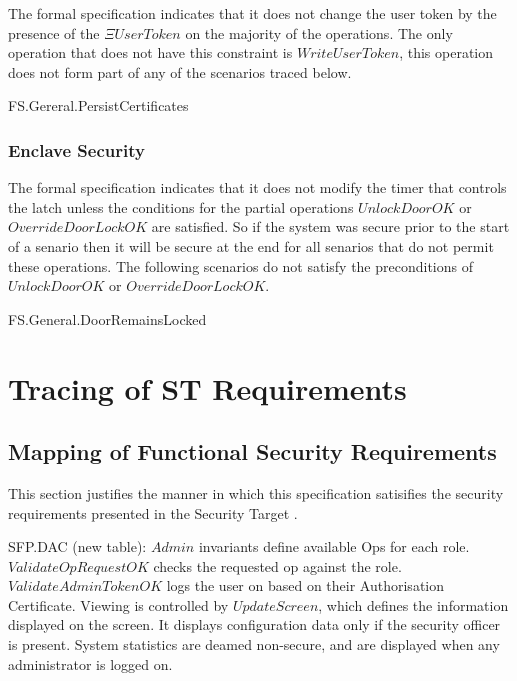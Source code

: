 The formal specification indicates that it does not change the user
token by the presence of the $\Xi UserToken$ on the majority of the
operations. The only operation that does not have this constraint is
$WriteUserToken$, this operation does not form part of any of the
scenarios traced below.

\begin{traceunit}{FS.Gereral.PersistCertificates}
\end{traceunit}%

\subsection{Enclave Security}

The formal specification indicates that it does not modify the timer
that controls the latch unless the conditions for the partial
operations $UnlockDoorOK$ or $OverrideDoorLockOK$ are satisfied. So if the
system was secure prior to the start of a senario then it will be
secure at the end for all senarios that do not permit these
operations.
The following scenarios do not satisfy the preconditions of
$UnlockDoorOK$ or $OverrideDoorLockOK$. 

\begin{traceunit}{FS.General.DoorRemainsLocked}
\end{traceunit}%

\chapter{Tracing of ST Requirements}
\label{sec:STTrace}
\section{Mapping of Functional Security Requirements}
\label{sec:mapST}
This section justifies the manner in which this specification
satisifies the security requirements presented in the Security Target
\cite{ST}. 


{\footnotesize \sf 
SFP.DAC (new table):
} 
\newline
	$Admin$ invariants define available Ops for each
role. $ValidateOpRequestOK$ checks the requested op against the
role. $ValidateAdminTokenOK$ logs the user on based on their
Authorisation Certificate. 
Viewing is controlled by $UpdateScreen$, which defines the information
displayed on the screen. It displays configuration data only if the
security officer is present. System statistics are deamed non-secure,
and are displayed when any administrator is logged on.

